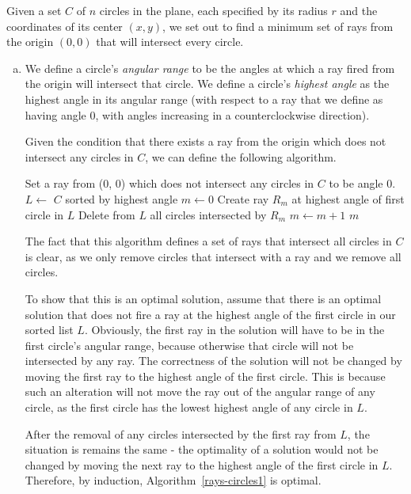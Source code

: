 Given a set $C$ of $n$ circles in the plane, each specified by its radius $r$ and the coordinates of its center $(x, y)$, we set out to find a minimum set of rays from the origin $(0, 0)$ that will intersect every circle.

\begin{enumerate}[(a)]
	\item We define a circle's \emph{angular range} to be the angles at which a ray fired from the origin will intersect that circle. We define a circle's \emph{highest angle} as the highest angle in its angular range (with respect to a ray that we define as having angle 0, with angles increasing in a counterclockwise direction).
	
	Given the condition that there exists a ray from the origin which does not intersect any circles in $C$, we can define the following algorithm.
	
	\begin{algorithm}
		\caption{}
		\label{rays-circles1}
		\begin{algorithmic}
			\State Set a ray from (0, 0) which does not intersect any circles in $C$ to be angle 0.
			\State $L \gets$ $C$ sorted by highest angle
			\State $m \gets 0$
				\State Create ray $R_{m}$ at highest angle of first circle in $L$
				\State Delete from $L$ all circles intersected by $R_{m}$
				\State $m \gets m+1$
			\EndWhile
			\State \Return $m$
		\end{algorithmic}
	\end{algorithm}
	
	The fact that this algorithm defines a set of rays that intersect all circles in $C$ is clear, as we only remove circles that intersect with a ray and we remove all circles. 
	
	To show that this is an optimal solution, assume that there is an optimal solution that does not fire a ray at the highest angle of the first circle in our sorted list $L$. Obviously, the first ray in the solution will have to be in the first circle's angular range, because otherwise that circle will not be intersected by any ray. The correctness of the solution will not be changed by moving the first ray to the highest angle of the first circle. This is because such an alteration will not move the ray out of the angular range of any circle, as the first circle has the lowest highest angle of any circle in $L$. 
	
	After the removal of any circles intersected by the first ray from $L$, the situation is remains the same - the optimality of a solution would not be changed by moving the next ray to the highest angle of the first circle in $L$. Therefore, by induction, Algorithm~\ref{rays-circles1} is optimal.
	

\end{enumerate}
